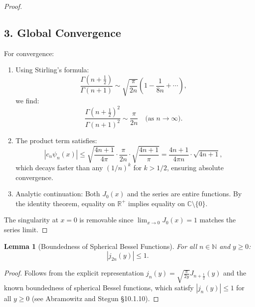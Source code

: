 \documentclass{article}
\newtheorem{lemma}{Lemma}
\begin{document}
\begin{proof}
\subsection*{3. Global Convergence}
For convergence:
\begin{enumerate}
\item Using Stirling's formula:
\begin{equation}
\frac{\Gamma\left(n+\frac{1}{2}\right)}{\Gamma(n+1)} \sim \sqrt{\frac{\pi}{2n}} \left(1 - \frac{1}{8n} + \cdots\right),
\end{equation}
we find:
\begin{equation}
\frac{\Gamma\left(n+\frac{1}{2}\right)^2}{\Gamma(n+1)^2} \sim \frac{\pi}{2n} \quad \text{(as } n\to\infty\text{)}.
\end{equation}

\item The product term satisfies:
\begin{equation}
|c_n \psi_n(x)| \leq \sqrt{\frac{4n+1}{4\pi}} \cdot \frac{\pi}{2n} \cdot \sqrt{\frac{4n+1}{\pi}} = \frac{4n+1}{4\pi n} \cdot \sqrt{4n+1},
\end{equation}
which decays faster than any $(1/n)^k$ for $k > 1/2$, ensuring absolute convergence.

\item Analytic continuation: Both $J_0(x)$ and the series are entire functions. By the identity theorem, equality on $\mathbb{R}^+$ implies equality on $\mathbb{C} \setminus \{0\}$.
\end{enumerate}

The singularity at $x=0$ is removable since $\lim_{x\to 0} J_0(x) = 1$ matches the series limit.
\end{proof}

\begin{lemma}[Boundedness of Spherical Bessel Functions]
For all $n \in \mathbb{N}$ and $y \geq 0$:
\begin{equation}
|j_{2n}(y)| \leq 1.
\end{equation}
\end{lemma}
\begin{proof}
Follows from the explicit representation $j_n(y) = \sqrt{\frac{\pi}{2y}} J_{n+\frac{1}{2}}(y)$ and the known boundedness of spherical Bessel functions, which satisfy $|j_n(y)| \leq 1$ for all $y \geq 0$ (see Abramowitz and Stegun \S 10.1.10).
\end{proof}
\end{document}

